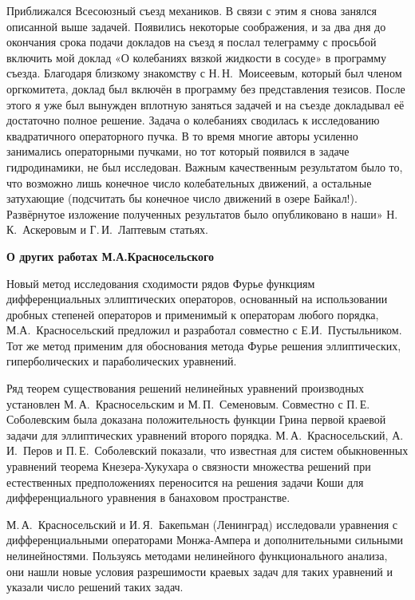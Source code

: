 Приближался Всесоюзный съезд механиков. В связи с этим я снова занялся описанной выше задачей. Появились некоторые соображения, и за два дня до окончания срока подачи докладов на съезд я послал телеграмму с просьбой включить мой доклад «О колебаниях вязкой жидкости в сосуде» в программу съезда. Благодаря близкому знакомству с Н.\,Н.~Моисеевым, который был членом оргкомитета, доклад был включён в программу без представления тезисов. После этого я уже был вынужден вплотную заняться задачей и на съезде докладывал её достаточно полное решение. Задача о колебаниях сводилась к исследованию квадратичного операторного пучка. В то время многие авторы усиленно занимались операторными пучками, но тот который появился в задаче гидродинамики, не был исследован. Важным качественным результатом было то, что возможно лишь конечное число колебательных движений, а остальные затухающие (подсчитать бы конечное число движений в озере Байкал!). Развёрнутое изложение полученных результатов было опубликовано в наши» Н.\,К.~Аскеровым и Г.\,И.~Лаптевым статьях.

{\bf О других работах М.А.Красносельского}

Новый метод исследования сходимости рядов Фурье фу\-н\-к\-ци\-ям дифференциальных эллиптических операторов,
основанный на  использовании дробных степеней операторов и применимый к операторам любого порядка,
М.А.~Красносельский предложил и разработал совместно с Е.И.~Пустыльником.  Тот же метод применим для обоснования метода Фурье
решения эллиптических, гиперболических и параболических уравнений.

Ряд теорем существования решений нелинейных уравнений производных установлен М.\,А.~Красносельским и
\linebreak
М.\,П.~Семеновым.
Совместно с П.\,Е. Соболевским  была доказана
положительность функции Грина первой краевой задачи для эллиптических уравнений второго порядка.
\linebreak
М.\,А.~Красносельский, А.\,И.~Перов и П.\,Е.~Соболевский показали,
что известная для систем обыкновенных уравнений теорема Кне\-зе\-ра-Ху\-ку\-ха\-ра о связности множества решений при естественных предположениях переносится на решения задачи Коши для дифференциального уравнения в банаховом пространстве.

М.\,А.~Красносельский и И.\,Я.~Бакепьман (Ленинград) исследовали уравнения с дифференциальными операторами Монжа-Ампера и дополнительными сильными нелинейностями. Пользуясь методами нелинейного функционального анализа, они нашли новые условия разрешимости краевых задач для таких уравнений и указали число решений таких задач.

